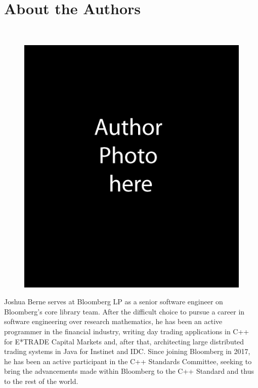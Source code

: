 \cleardoublepage
\chapter*{About the Authors}

\hspace*{\fill}\\  
\begin{figure}\includegraphics{booksample-authorphoto-JMB}\end{figure} \noindent Joshua Berne serves at Bloomberg LP as a senior software engineer on Bloomberg’s core library team. After the difficult choice to pursue a career in software engineering over research mathematics, he has been an active programmer in the financial industry, writing day trading applications in C++ for E*TRADE Capital Markets and, after that, architecting large distributed trading systems in Java for Instinet and IDC. Since joining Bloomberg in 2017, he has been an active participant in the C++ Standards Committee, seeking to bring the advancements made within Bloomberg to the C++ Standard and thus to the rest of the world. 

